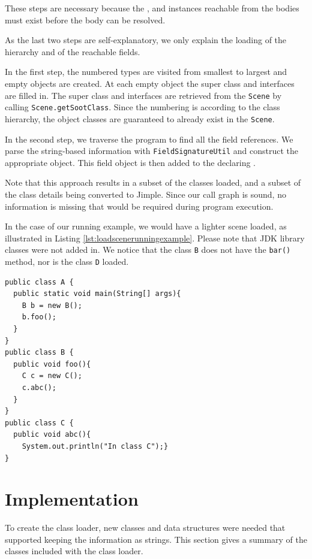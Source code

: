 \documentclass{sigplanconf}
\begin{document}
These steps are necessary because the \sootclass, \sootfield and \sootmethod instances reachable from the bodies must exist before the body can be resolved.

As the last two steps are self-explanatory, we only explain the loading of the hierarchy and of the reachable fields.

In the first step, the numbered types are visited from smallest to largest and empty \sootclass objects are created. At each empty \sootclass object the super class and interfaces are filled in. The super class and interfaces are retrieved from the {\tt Scene} by calling {\tt Scene.getSootClass}. Since the numbering is according to the class hierarchy, the object classes are guaranteed to already exist in the {\tt Scene}.

In the second step, we traverse the program to find all the field references. We parse the string-based information with
{\tt Field\-Signature\-Util} and construct the appropriate \sootfield object. This field object is then added to the declaring \sootclass.


Note that this approach results in a subset of the classes loaded, and a subset of the class details being converted to Jimple. Since our call graph is sound, no information is missing that would be required during program execution.

In the case of our running example, we would have a lighter scene loaded, as illustrated in Listing \ref{lst:loadscenerunningexample}. Please note that JDK library classes were not added in. We notice that the class {\tt B} does not have the {\tt bar()} method, nor is the class {\tt D} loaded.

\begin{lstlisting}[caption={Loaded Scene for Running example},label={lst:loadscenerunningexample},float=!ht]
public class A {
  public static void main(String[] args){
    B b = new B();
    b.foo();
  }
}
public class B {
  public void foo(){
    C c = new C();
    c.abc();
  }
}
public class C {
  public void abc(){
    System.out.println("In class C");}
}
\end{lstlisting}

\section{Implementation} %
\label{sec:api}
To create the \rb class loader, new classes and data structures were needed that supported keeping the information as strings. This section gives a summary of the classes included with the \rb class loader.
\end{document}
